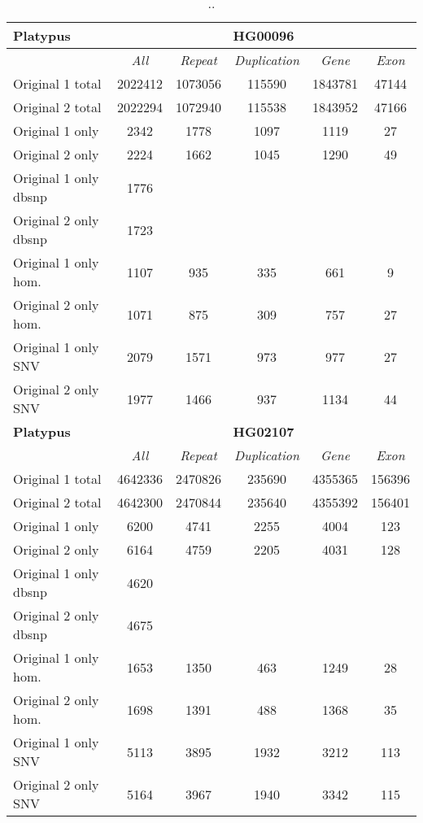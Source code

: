 \clearpage

\begin{table}[htb]
\begin{center}
\begin{tabular}{|l|c||c|c|c|c|}
\hline
{\bf Platypus} & \multicolumn{5}{|c|}{\bf HG00096} \\
\hline
\cline{2-6}
{\bf} & {\it All} & {\it Repeat} & {\it Duplication} & {\it Gene} & {\it Exon} \\
\hline
Original 1 total & 2022412 & 1073056 & 115590 & 1843781 & 47144\\ 
\hline
Original 2 total & 2022294 & 1072940 & 115538 & 1843952 & 47166\\ 
\hline
Original 1 only & 2342 & 1778 & 1097 & 1119 & 27\\ 
\hline
Original 2 only & 2224 & 1662 & 1045 & 1290 & 49\\ 
\hline
Original 1 only dbsnp & 1776 &  &  &  & \\ 
\hline
Original 2 only dbsnp & 1723 &  &  &  & \\ 
\hline
Original 1 only hom. & 1107 & 935 & 335 & 661 & 9\\ 
\hline
Original 2 only hom. & 1071 & 875 & 309 & 757 & 27\\ 
\hline
Original 1 only SNV & 2079 & 1571 & 973 & 977 & 27\\ 
\hline
Original 2 only SNV & 1977 & 1466 & 937 & 1134 & 44\\ 
\hline
\hline
{\bf Platypus} & \multicolumn{5}{|c|}{\bf HG02107} \\
\hline
\cline{2-6}
{\bf} & {\it All} & {\it Repeat} & {\it Duplication} & {\it Gene} & {\it Exon} \\
\hline
Original 1 total & 4642336 & 2470826 & 235690 & 4355365 & 156396\\ 
\hline
Original 2 total & 4642300 & 2470844 & 235640 & 4355392 & 156401\\ 
\hline
Original 1 only & 6200 & 4741 & 2255 & 4004 & 123\\ 
\hline
Original 2 only & 6164 & 4759 & 2205 & 4031 & 128\\ 
\hline
Original 1 only dbsnp & 4620 &  &  &  & \\ 
\hline
Original 2 only dbsnp & 4675 &  &  &  & \\ 
\hline
Original 1 only hom. & 1653 & 1350 & 463 & 1249 & 28\\ 
\hline
Original 2 only hom. & 1698 & 1391 & 488 & 1368 & 35\\ 
\hline
Original 1 only SNV & 5113 & 3895 & 1932 & 3212 & 113\\ 
\hline
Original 2 only SNV & 5164 & 3967 & 1940 & 3342 & 115\\ 
\hline
\end{tabular}
\end{center}
\caption{ .. }
\label{tab:orig-vs-shuf-platypus}
\end{table}

